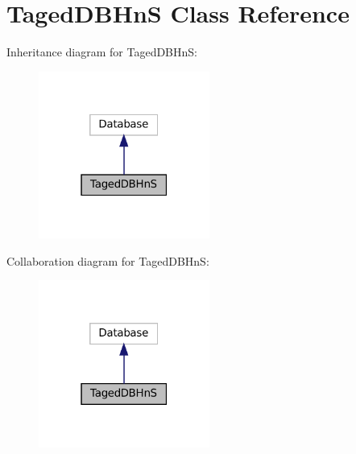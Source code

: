 \hypertarget{class_taged_d_b_hn_s}{}\section{Taged\+D\+B\+HnS Class Reference}
\label{class_taged_d_b_hn_s}


Inheritance diagram for Taged\+D\+B\+HnS\+:\nopagebreak
\begin{figure}[H]
\begin{center}
\leavevmode
\includegraphics[width=159pt]{class_taged_d_b_hn_s__inherit__graph}
\end{center}
\end{figure}


Collaboration diagram for Taged\+D\+B\+HnS\+:\nopagebreak
\begin{figure}[H]
\begin{center}
\leavevmode
\includegraphics[width=159pt]{class_taged_d_b_hn_s__coll__graph}
\end{center}
\end{figure}
